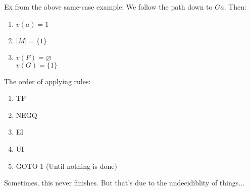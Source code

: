Ex from the above same-case example: We follow the path down to $Ga$.
Then:
\begin{enumerate}
\item $v(a) = 1$ 
\item $|M| = \{1\}$
\item $v(F) = \varnothing$ \\
$v(G) = \{1\}$
\end{enumerate}

The order of applying rules:
\begin{enumerate}
\item TF
\item NEGQ
\item EI
\item UI
\item GOTO 1 (Until nothing is done)
\end{enumerate}

\begin{remark}
Sometimes, this never finishes. But that's due to the undecidiblity of things...
\end{remark}


